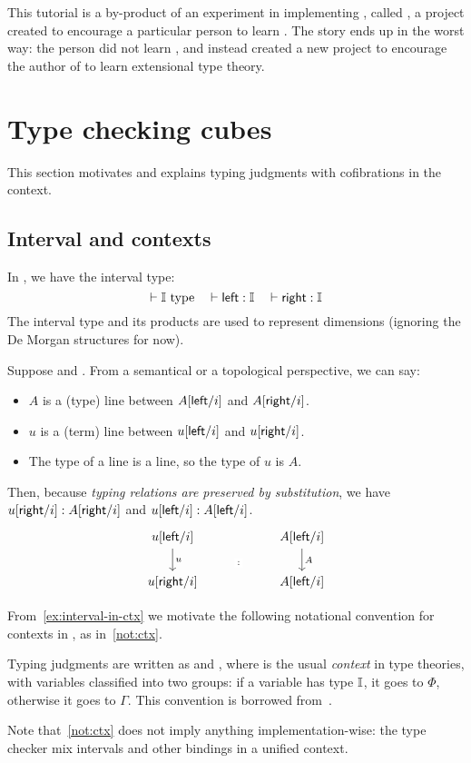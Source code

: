 This tutorial is a by-product of an experiment in implementing \CTT, called \GuestName,
a project created to encourage a particular person to learn \CTT.
The story ends up in the worst way: the person did not learn \CTT, and instead created
a new project to encourage the author of \GuestName{} to learn extensional type theory.

\section{Type checking cubes}\label{sec:tyck-cube}
This section motivates and explains typing judgments with cofibrations in the context.

\subsection{Interval and contexts}\label{sub:interval}
In \CTT, we have the interval type:
\[\vdash \mathbb{I}~\text{type}\quad \vdash \textsf{left}:\mathbb{I} \quad \vdash \textsf{right}:\mathbb{I}\]
The interval type and its products are used to represent dimensions
(ignoring the De Morgan structures for now).
\begin{example}\label{ex:interval-in-ctx}
Suppose  and .
From a semantical or a topological perspective, we can say:
\begin{itemize}
\item $A$ is a (type) line between $A[\textsf{left}/i]$ and $A[\textsf{right}/i]$.
\item $u$ is a (term) line between $u[\textsf{left}/i]$ and $u[\textsf{right}/i]$.
\item The type of a line is a line, so the type of $u$ is $A$.
\end{itemize}
Then, because \emph{typing relations are preserved by substitution},
we have $u[\textsf{right}/i]:A[\textsf{right}/i]$ and $u[\textsf{left}/i]:A[\textsf{left}/i]$.
\[\begin{tikzcd}
	{u[\lcon/i]} & {} & {A[\lcon/i]} \\
	{u[\rcon/i]} & {} & {A[\lcon/i]}
	\arrow["u", from=1-1, to=2-1]
	\arrow["A", from=1-3, to=2-3]
	\arrow["{:}"{description}, draw=none, from=1-2, to=2-2]
\end{tikzcd}\]
\end{example}
From~\cref{ex:interval-in-ctx} we motivate the following notational
convention for contexts in \CTT, as in~\cref{not:ctx}.
\begin{notation}\label{not:ctx}
Typing judgments are written as  and ,
where \fbox{$\Phi;\Gamma$} is the usual \textit{context} in type theories,
with variables classified into two groups: if a variable has type $\mathbb{I}$,
it goes to $\Phi$, otherwise it goes to $\Gamma$.
This convention is borrowed from~\cite{ABCFHL}.
\end{notation}
Note that~\cref{not:ctx} does not imply anything implementation-wise:
the \GuestName{} type checker mix intervals and other bindings in a unified context.

